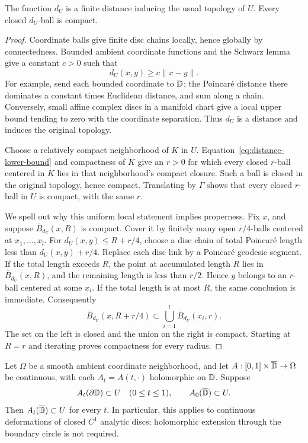 \begin{proposition}\label{prop:proper-distance}
The function $d_U$ is a finite distance inducing the usual topology of $U$.
Every closed $d_U$-ball is compact.
\end{proposition}

\begin{proof}
Coordinate balls give finite disc chains locally, hence globally by
connectedness.  Bounded ambient coordinate functions and the Schwarz lemma
give a constant $c>0$ such that
\begin{equation}\label{eq:distance-lower-bound}
                         d_U(x,y)\geq c\|x-y\|.
\end{equation}
For example, send each bounded coordinate to $\mathbb D$; the Poincar\'e distance
there dominates a constant times Euclidean distance, and sum along a chain.
Conversely, small affine complex discs in a manifold chart give a local
upper bound tending to zero with the coordinate separation.  Thus $d_U$ is
a distance and induces the original topology.

Choose a relatively compact neighborhood of $K$ in $U$.
Equation~\eqref{eq:distance-lower-bound} and compactness of $K$ give an
$r>0$ for which every closed $r$-ball centered in $K$ lies in that
neighborhood's compact closure.  Such a ball is closed in the original
topology, hence compact.  Translating by $\Gamma$ shows that every closed
$r$-ball in $U$ is compact, with the same $r$.

We spell out why this uniform local statement implies properness.  Fix $x$,
and suppose $\overline B_{d_U}(x,R)$ is compact.  Cover it by finitely many
open $r/4$-balls centered at $x_1,\ldots,x_l$.  For
$d_U(x,y)\leq R+r/4$, choose a disc chain of total Poincar\'e length less than
$d_U(x,y)+r/4$.  Replace each disc link by a Poincar\'e geodesic segment.
If the total length exceeds $R$, the point at accumulated length $R$
lies in $\overline B_{d_U}(x,R)$, and the remaining length is less than
$r/2$.  Hence $y$ belongs to an $r$-ball centered at some $x_i$.
If the total length is at most $R$, the same conclusion is immediate.
Consequently
\[
  \overline B_{d_U}(x,R+r/4)
       \subset\bigcup_{i=1}^l\overline B_{d_U}(x_i,r).
\]
The set on the left is closed and the union on the right is compact.
Starting at $R=r$ and iterating proves compactness for every radius.
\end{proof}

\begin{lemma}\label{lem:continuity}
Let $\Omega$ be a smooth ambient coordinate neighborhood, and let
$A:[0,1]\times\overline{\mathbb D}\to\Omega$ be continuous, with each
$A_t=A(t,\cdot)$ holomorphic on $\mathbb D$.  Suppose
\[
  A_t(\partial\mathbb D)\subset U\quad(0\leq t\leq1),
  \qquad A_0(\overline{\mathbb D})\subset U.
\]
Then $A_t(\overline{\mathbb D})\subset U$ for every $t$.  In particular, this applies
to continuous deformations of closed $C^1$ analytic discs; holomorphic
extension through the boundary circle is not required.
\end{lemma}

